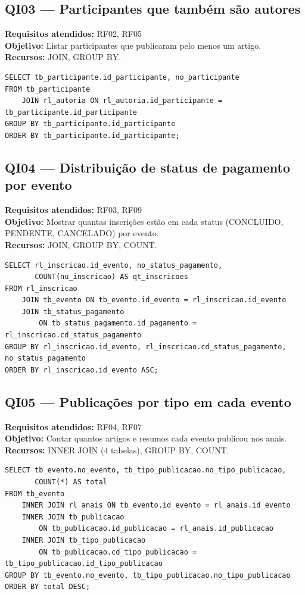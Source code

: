\documentclass[12pt]{article}
\begin{document}
\subsection{QI03 --- Participantes que também são autores}
\textbf{Requisitos atendidos:} RF02, RF05 \\
\textbf{Objetivo:} Listar participantes que publicaram pelo menos um artigo.\\
\textbf{Recursos:} JOIN, GROUP BY.
\begin{lstlisting}[caption={QI03 -- Participantes que também são autores.}]
SELECT tb_participante.id_participante, no_participante
FROM tb_participante
    JOIN rl_autoria ON rl_autoria.id_participante = tb_participante.id_participante
GROUP BY tb_participante.id_participante
ORDER BY tb_participante.id_participante;
\end{lstlisting}

\subsection{QI04 --- Distribuição de status de pagamento por evento}
\textbf{Requisitos atendidos:} RF03, RF09 \\
\textbf{Objetivo:} Mostrar quantas inscrições estão em cada status (CONCLUIDO, PENDENTE, CANCELADO) por evento.\\
\textbf{Recursos:} JOIN, GROUP BY, COUNT.
\begin{lstlisting}[caption={QI04 -- Status de pagamento por evento.}]
SELECT rl_inscricao.id_evento, no_status_pagamento,
       COUNT(nu_inscricao) AS qt_inscricoes
FROM rl_inscricao
    JOIN tb_evento ON tb_evento.id_evento = rl_inscricao.id_evento
    JOIN tb_status_pagamento
        ON tb_status_pagamento.id_pagamento = rl_inscricao.cd_status_pagamento
GROUP BY rl_inscricao.id_evento, rl_inscricao.cd_status_pagamento, no_status_pagamento
ORDER BY rl_inscricao.id_evento ASC;
\end{lstlisting}

\subsection{QI05 --- Publicações por tipo em cada evento}
\textbf{Requisitos atendidos:} RF04, RF07 \\
\textbf{Objetivo:} Contar quantos artigos e resumos cada evento publicou nos anais.\\
\textbf{Recursos:} INNER JOIN (4 tabelas), GROUP BY, COUNT.
\begin{lstlisting}[caption={QI05 -- Publicações por tipo em cada evento.}]
SELECT tb_evento.no_evento, tb_tipo_publicacao.no_tipo_publicacao,
       COUNT(*) AS total
FROM tb_evento
    INNER JOIN rl_anais ON tb_evento.id_evento = rl_anais.id_evento
    INNER JOIN tb_publicacao
        ON tb_publicacao.id_publicacao = rl_anais.id_publicacao
    INNER JOIN tb_tipo_publicacao
        ON tb_publicacao.cd_tipo_publicacao = tb_tipo_publicacao.id_tipo_publicacao
GROUP BY tb_evento.no_evento, tb_tipo_publicacao.no_tipo_publicacao
ORDER BY total DESC;
\end{lstlisting}
\end{document}
